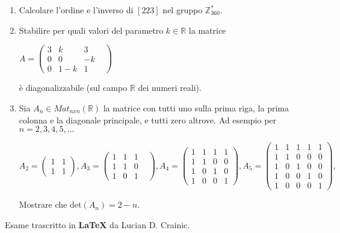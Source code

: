 \documentclass[fleqn]{article}
\begin{document}
\begin{enumerate}
    \item Calcolare l'ordine e l'inverso di $[223]$ nel gruppo $\mathbb{Z}_{360}^*$.
    
    \item Stabilire per quali valori del parametro $k \in \mathbb{R}$ la matrice 
    \begin{center}
    $A = \begin{pmatrix}
          3 & k & 3\\
          0 & 0 & -k  \\
          0 & 1-k & 1 &
       \end{pmatrix}$
    \end{center}
    è diagonalizzabile (sul campo $\mathbb{R}$ dei numeri reali).

    \item Sia $A_n \in Mat_{nxn}(\mathbb{R})$ la matrice con tutti uno sulla prima riga, la prima colonna
    e la diagonale principale, e tutti zero altrove. Ad esempio per $n=2,3,4,5,...$
    \begin{center}
    $
    A_2 = \begin{pmatrix}
          1 & 1 \\
          1 & 1
       \end{pmatrix},
    A_3 = \begin{pmatrix}
        1 & 1 & 1\\
        1 & 1 & 0  \\
        1 & 0 & 1 &
     \end{pmatrix},
    A_4 = \begin{pmatrix}
        1 & 1 & 1 & 1\\
        1 & 1 & 0 & 0  \\
        1 & 0 & 1 & 0 \\
        1 & 0 & 0 & 1 
     \end{pmatrix},
    A_5 = \begin{pmatrix}
        1 & 1 & 1 & 1 & 1\\
        1 & 1 & 0 & 0 & 0  \\
        1 & 0 & 1 & 0 & 0 \\
        1 & 0 & 0 & 1 & 0 \\
        1 & 0 & 0 & 0 & 1
     \end{pmatrix},
    $
    \end{center}
     Mostrare che det$(A_n) = 2-n$.
\end{enumerate}
Esame trascritto in \textbf{\LaTeX} da Lucian D. Crainic.
\end{document}
